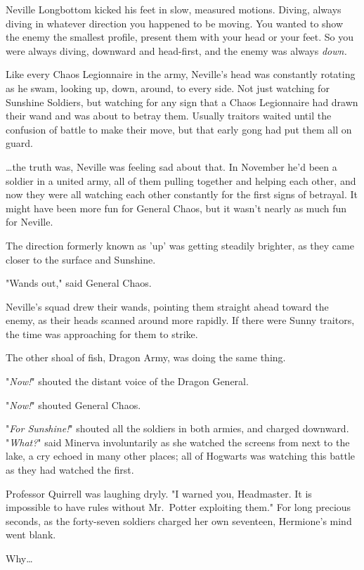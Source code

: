 Neville Longbottom kicked his feet in slow, measured motions. Diving, always 
diving in whatever direction you happened to be moving. You wanted to show the 
enemy the smallest profile, present them with your head or your feet. So you 
were always diving, downward and head-first, and the enemy was always 
\emph{down.}

Like every Chaos Legionnaire in the army, Neville's head was constantly 
rotating as he swam, looking up, down, around, to every side. Not just watching 
for Sunshine Soldiers, but watching for any sign that a Chaos Legionnaire had 
drawn their wand and was about to betray them. Usually traitors waited until 
the confusion of battle to make their move, but that early gong had put them 
all on guard.

{\ldots}the truth was, Neville was feeling sad about that. In November he'd 
been a soldier in a united army, all of them pulling together and helping each 
other, and now they were all watching each other constantly for the first signs 
of betrayal. It might have been more fun for General Chaos, but it wasn't 
nearly as much fun for Neville.

The direction formerly known as 'up' was getting steadily brighter, as they 
came closer to the surface and Sunshine.

"Wands out," said General Chaos.

Neville's squad drew their wands, pointing them straight ahead toward the 
enemy, as their heads scanned around more rapidly. If there were Sunny 
traitors, the time was approaching for them to strike.

The other shoal of fish, Dragon Army, was doing the same thing.

"\emph{Now!}" shouted the distant voice of the Dragon General.

"\emph{Now!}" shouted General Chaos.

"\emph{For Sunshine!}" shouted all the soldiers in both armies, and charged 
downward.
\sbreak
"\emph{What?}" said Minerva involuntarily as she watched the screens from next 
to the lake, a cry echoed in many other places; all of Hogwarts was watching 
this battle as they had watched the first.

Professor Quirrell was laughing dryly. "I warned you, Headmaster. It is 
impossible to have rules without Mr.~Potter exploiting them."
\sbreak
For long precious seconds, as the forty-seven soldiers charged her own 
seventeen, Hermione's mind went blank.

Why{\ldots}

